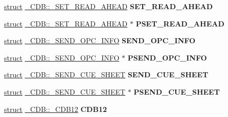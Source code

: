 \begin{DoxyCompactItemize}
\item 
\mbox{\label{union___c_d_b_a64b1a7cf464824f3424bb086aa13ef91}} 
\hyperlink{interfacestruct}{struct} \hyperlink{struct___c_d_b_1_1___s_e_t___r_e_a_d___a_h_e_a_d}{\+\_\+\+C\+D\+B\+::\+\_\+\+S\+E\+T\+\_\+\+R\+E\+A\+D\+\_\+\+A\+H\+E\+AD} {\bfseries S\+E\+T\+\_\+\+R\+E\+A\+D\+\_\+\+A\+H\+E\+AD}
\item 
\mbox{\label{union___c_d_b_a14e20a70234329a6ab734757d85e6fd7}} 
\hyperlink{interfacestruct}{struct} \hyperlink{struct___c_d_b_1_1___s_e_t___r_e_a_d___a_h_e_a_d}{\+\_\+\+C\+D\+B\+::\+\_\+\+S\+E\+T\+\_\+\+R\+E\+A\+D\+\_\+\+A\+H\+E\+AD} $\ast$ {\bfseries P\+S\+E\+T\+\_\+\+R\+E\+A\+D\+\_\+\+A\+H\+E\+AD}
\item 
\mbox{\label{union___c_d_b_a07290776719846e86b5fe7881b7d19d5}} 
\hyperlink{interfacestruct}{struct} \hyperlink{struct___c_d_b_1_1___s_e_n_d___o_p_c___i_n_f_o}{\+\_\+\+C\+D\+B\+::\+\_\+\+S\+E\+N\+D\+\_\+\+O\+P\+C\+\_\+\+I\+N\+FO} {\bfseries S\+E\+N\+D\+\_\+\+O\+P\+C\+\_\+\+I\+N\+FO}
\item 
\mbox{\label{union___c_d_b_af7ea4f18c494421c139919ef0e49f7c9}} 
\hyperlink{interfacestruct}{struct} \hyperlink{struct___c_d_b_1_1___s_e_n_d___o_p_c___i_n_f_o}{\+\_\+\+C\+D\+B\+::\+\_\+\+S\+E\+N\+D\+\_\+\+O\+P\+C\+\_\+\+I\+N\+FO} $\ast$ {\bfseries P\+S\+E\+N\+D\+\_\+\+O\+P\+C\+\_\+\+I\+N\+FO}
\item 
\mbox{\label{union___c_d_b_abb4592820a74d89ef28f8ffccf4e544f}} 
\hyperlink{interfacestruct}{struct} \hyperlink{struct___c_d_b_1_1___s_e_n_d___c_u_e___s_h_e_e_t}{\+\_\+\+C\+D\+B\+::\+\_\+\+S\+E\+N\+D\+\_\+\+C\+U\+E\+\_\+\+S\+H\+E\+ET} {\bfseries S\+E\+N\+D\+\_\+\+C\+U\+E\+\_\+\+S\+H\+E\+ET}
\item 
\mbox{\label{union___c_d_b_a48d7ff78d3d545d1e86228e7de64ef26}} 
\hyperlink{interfacestruct}{struct} \hyperlink{struct___c_d_b_1_1___s_e_n_d___c_u_e___s_h_e_e_t}{\+\_\+\+C\+D\+B\+::\+\_\+\+S\+E\+N\+D\+\_\+\+C\+U\+E\+\_\+\+S\+H\+E\+ET} $\ast$ {\bfseries P\+S\+E\+N\+D\+\_\+\+C\+U\+E\+\_\+\+S\+H\+E\+ET}
\item 
\mbox{\label{union___c_d_b_a69a044128a67e8797f4974951ecde6c9}} 
\hyperlink{interfacestruct}{struct} \hyperlink{struct___c_d_b_1_1___c_d_b12}{\+\_\+\+C\+D\+B\+::\+\_\+\+C\+D\+B12} {\bfseries C\+D\+B12}

\end{DoxyCompactItemize}
